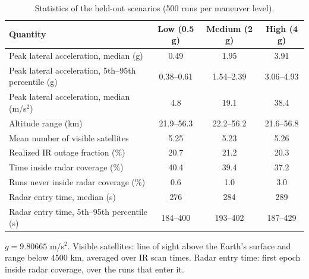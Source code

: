 \begin{table}[!htbp]
\caption{Statistics of the held-out scenarios (500 runs per maneuver level).}
\label{tab:S11}
\centering\footnotesize\setlength{\tabcolsep}{5pt}
\begin{tabular}{@{}lccc@{}}
\toprule
Quantity & Low (0.5 g) & Medium (2 g) & High (4 g) \\
\midrule
Peak lateral acceleration, median (g) & 0.49 & 1.95 & 3.91 \\
Peak lateral acceleration, 5th--95th percentile (g) & 0.38--0.61 & 1.54--2.39 & 3.06--4.93 \\
Peak lateral acceleration, median (m/s$^2$) & 4.8 & 19.1 & 38.4 \\
Altitude range (km) & 21.9--56.3 & 22.2--56.2 & 21.6--56.8 \\
Mean number of visible satellites & 5.25 & 5.23 & 5.26 \\
Realized IR outage fraction (\%) & 20.7 & 21.2 & 20.3 \\
Time inside radar coverage (\%) & 40.4 & 39.4 & 37.2 \\
Runs never inside radar coverage (\%) & 0.6 & 1.0 & 3.0 \\
Radar entry time, median (s) & 276 & 284 & 289 \\
Radar entry time, 5th--95th percentile (s) & 184--400 & 193--402 & 187--429 \\
\bottomrule
\end{tabular}

\smallskip
\parbox{\textwidth}{\footnotesize $g = 9.80665$ m/s$^2$. Visible satellites: line of sight above the Earth's surface and range below 4500 km, averaged over IR scan times. Radar entry time: first epoch inside radar coverage, over the runs that enter it.}
\end{table}
